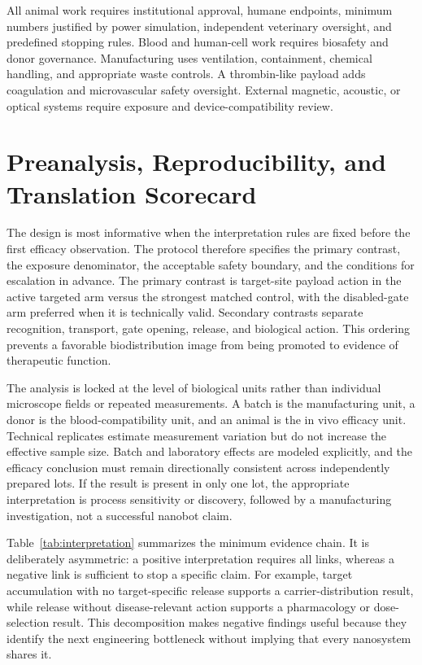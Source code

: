 \documentclass[conference]{IEEEtran}
\begin{document}
All animal work requires institutional approval, humane endpoints, minimum numbers justified by power simulation, independent veterinary oversight, and predefined stopping rules. Blood and human-cell work requires biosafety and donor governance. Manufacturing uses ventilation, containment, chemical handling, and appropriate waste controls. A thrombin-like payload adds coagulation and microvascular safety oversight. External magnetic, acoustic, or optical systems require exposure and device-compatibility review.

\section{Preanalysis, Reproducibility, and Translation Scorecard}
\label{sec:scorecard}
The design is most informative when the interpretation rules are fixed before the first efficacy observation. The protocol therefore specifies the primary contrast, the exposure denominator, the acceptable safety boundary, and the conditions for escalation in advance. The primary contrast is target-site payload action in the active targeted arm versus the strongest matched control, with the disabled-gate arm preferred when it is technically valid. Secondary contrasts separate recognition, transport, gate opening, release, and biological action. This ordering prevents a favorable biodistribution image from being promoted to evidence of therapeutic function.

The analysis is locked at the level of biological units rather than individual microscope fields or repeated measurements. A batch is the manufacturing unit, a donor is the blood-compatibility unit, and an animal is the in vivo efficacy unit. Technical replicates estimate measurement variation but do not increase the effective sample size. Batch and laboratory effects are modeled explicitly, and the efficacy conclusion must remain directionally consistent across independently prepared lots. If the result is present in only one lot, the appropriate interpretation is process sensitivity or discovery, followed by a manufacturing investigation, not a successful nanobot claim.

Table~\ref{tab:interpretation} summarizes the minimum evidence chain. It is deliberately asymmetric: a positive interpretation requires all links, whereas a negative link is sufficient to stop a specific claim. For example, target accumulation with no target-specific release supports a carrier-distribution result, while release without disease-relevant action supports a pharmacology or dose-selection result. This decomposition makes negative findings useful because they identify the next engineering bottleneck without implying that every nanosystem shares it.
\end{document}
